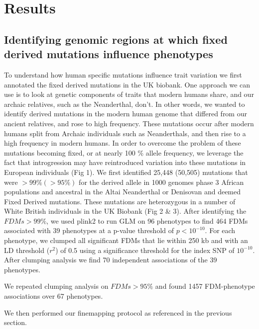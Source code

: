\section{Results}
\subsection{Identifying genomic regions at which fixed derived mutations influence phenotypes}
To understand how human specific mutations influence trait variation we first annotated the fixed derived mutations in the UK biobank. One approach we can use is to look at genetic components of traits that modern humans share, and our archaic relatives, such as the Neanderthal, don’t. In other words, we wanted to identify derived mutations in the modern human genome that differed from our ancient relatives, and rose to high frequency. These mutations occur after modern humans split from Archaic individuals such as Neanderthals, and then rise to a high frequency in modern humans. In order to overcome the problem of these mutations becoming fixed, or at nearly 100 \% allele frequency, we leverage the fact that introgression may have reintroduced variation into these mutations in European individuals (Fig 1). We first identified  25,448 (50,505) mutations that were $>99\% (>95\%)$ for the derived allele in 1000 genomes phase 3 African populations and ancestral in the Altai Neanderthal or Denisovan and deemed Fixed Derived mutations. These mutations are heterozygous in a number of White British individuals in the UK Biobank (Fig 2 \& 3). After identifying the $FDMs >99\%$, we used plink2 to run GLM on 96 phenotypes to find 464 FDMs associated with 39 phenotypes at a p-value threshold of $p<10^{-10}$.  For each phenotype, we clumped all significant FDMs that lie within 250 kb and with an LD threshold ($r^2$) of 0.5 using a significance threshold for the index SNP of $10^{-10}$. After clumping analysis we find 70 independent associations of the 39 phenotypes.

We repeated clumping analysis on $FDMs > 95\%$ and found 1457 FDM-phenotype associations over 67 phenotypes. 

We then performed our finemapping protocol as referenced in the previous section. 
